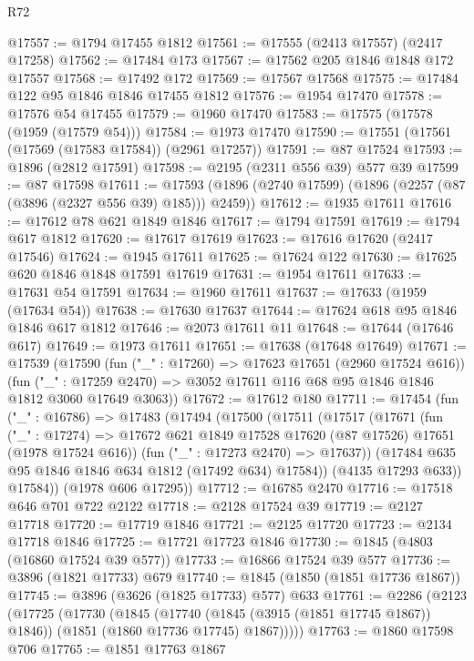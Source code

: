 \begin{lexlean}{R72}
\begin{coremodule}
@17557 := @1794 @17455 @1812
@17561 := @17555 (@2413 @17557) (@2417 @17258)
@17562 := @17484 @173
@17567 := @17562 @205 @1846 @1848 @172 @17557
@17568 := @17492 @172
@17569 := @17567 @17568
@17575 := @17484 @122 @95 @1846 @1846 @17455 @1812
@17576 := @1954 @17470
@17578 := @17576 @54 @17455
@17579 := @1960 @17470
@17583 := @17575 (@17578 (@1959 (@17579 @54)))
@17584 := @1973 @17470
@17590 := @17551 (@17561 (@17569 (@17583 @17584)) (@2961 @17257))
@17591 := @87 @17524
@17593 := @1896 (@2812 @17591)
@17598 := @2195 (@2311 @556 @39) @577 @39
@17599 := @87 @17598
@17611 := @17593 (@1896 (@2740 @17599) (@1896 (@2257 (@87 (@3896 (@2327 @556 @39) @185))) @2459))
@17612 := @1935 @17611
@17616 := @17612 @78 @621 @1849 @1846
@17617 := @1794 @17591
@17619 := @1794 @617 @1812
@17620 := @17617 @17619
@17623 := @17616 @17620 (@2417 @17546)
@17624 := @1945 @17611
@17625 := @17624 @122
@17630 := @17625 @620 @1846 @1848 @17591 @17619
@17631 := @1954 @17611
@17633 := @17631 @54 @17591
@17634 := @1960 @17611
@17637 := @17633 (@1959 (@17634 @54))
@17638 := @17630 @17637
@17644 := @17624 @618 @95 @1846 @1846 @617 @1812
@17646 := @2073 @17611 @11
@17648 := @17644 (@17646 @617)
@17649 := @1973 @17611
@17651 := @17638 (@17648 @17649)
@17671 := @17539
    (@17590
      (fun ("_" : @17260) => @17623 @17651 (@2960 @17524 @616))
      (fun ("_" : @17259 @2470) => @3052 @17611 @116 @68 @95 @1846 @1846 @1812 @3060 @17649 @3063))
@17672 := @17612 @180
@17711 := @17454
    (fun ("_" : @16786) =>
    @17483
      (@17494
        (@17500
          (@17511
            (@17517
              (@17671
                (fun ("_" : @17274) =>
                @17672 @621 @1849 @17528 @17620 (@87 @17526) @17651 (@1978 @17524 @616))
                (fun ("_" : @17273 @2470) => @17637))
              (@17484 @635 @95 @1846 @1846 @634 @1812 (@17492 @634) @17584))
            (@4135 @17293 @633))
          @17584))
      (@1978 @606 @17295))
@17712 := @16785 @2470
@17716 := @17518 @646 @701 @722 @2122
@17718 := @2128 @17524 @39
@17719 := @2127 @17718
@17720 := @17719 @1846
@17721 := @2125 @17720
@17723 := @2134 @17718 @1846
@17725 := @17721 @17723 @1846
@17730 := @1845 (@4803 (@16860 @17524 @39 @577))
@17733 := @16866 @17524 @39 @577
@17736 := @3896 (@1821 @17733) @679
@17740 := @1845 (@1850 (@1851 @17736 @1867))
@17745 := @3896 (@3626 (@1825 @17733) @577) @633
@17761 := @2286
    (@2123
      (@17725
        (@17730
          (@1845
            (@17740 (@1845 (@3915 (@1851 @17745 @1867)) @1846))
            (@1851 (@1860 @17736 @17745) @1867)))))
@17763 := @1860 @17598 @706
@17765 := @1851 @17763 @1867

\end{coremodule}
\end{lexlean}
